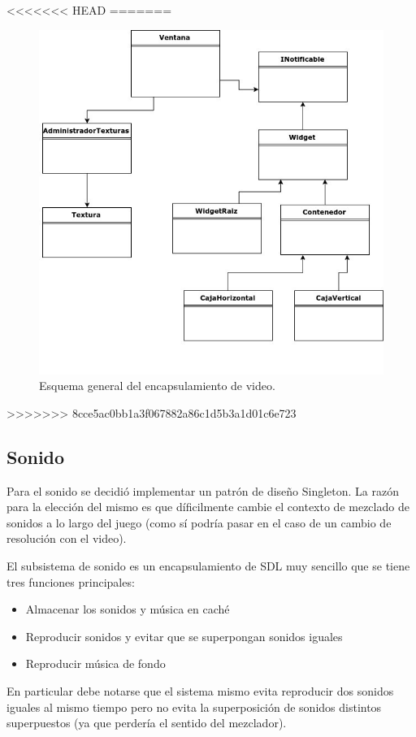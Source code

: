 \documentclass[titlepage,a4paper,12pt]{article}
\begin{document}
<<<<<<< HEAD
=======
\begin{figure}[H]
	\centering
	\includegraphics[width=12cm]{../imagenes/cliente-esquema-video.jpg}
	\caption{\label{fig:cliente-esquema-video} Esquema general del encapsulamiento de video.}
\end{figure}

>>>>>>> 8cce5ac0bb1a3f067882a86c1d5b3a1d01c6e723
\subsection{Sonido}
Para el sonido se decidió implementar un patrón de diseño Singleton. La razón para la elección del mismo es que díficilmente cambie el contexto de mezclado de sonidos a lo largo del juego (como sí podría pasar en el caso de un cambio de resolución con el video).

El subsistema de sonido es un encapsulamiento de SDL muy sencillo que se tiene tres funciones principales:
\begin{itemize}
\item Almacenar los sonidos y música en caché
\item Reproducir sonidos y evitar que se superpongan sonidos iguales
\item Reproducir música de fondo
\end{itemize}

En particular debe notarse que el sistema mismo evita reproducir dos sonidos iguales al mismo tiempo pero no evita la superposición de  sonidos distintos superpuestos (ya que perdería el sentido del mezclador).
\end{document}
